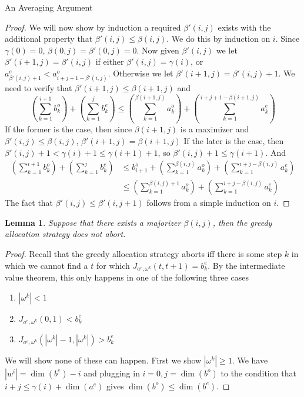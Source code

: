 \documentclass[11pt,a4paper]{article}
\newtheorem{lemma}[subsection]{Lemma}
\begin{document}
\begin{section}{An Averaging Argument}
\begin{proof}
\medskip
We will now show by induction a required $\beta'(i, j)$ exists with the additional property that $\beta'(i,j) \leq \beta(i, j)$. We do this by induction on $i$. Since $\gamma(0) = 0$, $\beta(0, j) = \beta'(0, j) = 0$. Now given $\beta'(i, j)$ we let $\beta'(i + 1, j) = \beta'(i, j)$ if either $\beta'(i, j) = \gamma(i)$, or $a^e_{\beta'(i, j) + 1} < a^o_{i + j + 1 - \beta'(i, j)}$. Otherwise we let $\beta'(i + 1, j) = \beta'(i ,j ) + 1$. We need to verify that $\beta'(i + 1, j) \leq \beta(i + 1, j)$ and
\[
\left ( \sum_{k = 1}^{i + 1} b^o_k \right ) + \left ( \sum_{k = 1}^j b^e_k \right ) \leq \left ( \sum_{k = 1}^{\beta(i + 1, j)} a^o_k \right ) + \left (\sum_{k = 1}^{ i + j +1 - \beta(i + 1, j) } a^e_k \right )
\]
If the former is the case, then since $\beta(i + 1, j)$ is a maximizer and $\beta'(i, j) \leq \beta(i, j)$, $\beta'(i + 1, j) = \beta(i + 1, j)$ If the later is the case, then $\beta'(i, j) + 1 < \gamma(i) + 1 \leq \gamma(i + 1) + 1$, so $\beta'(i, j) + 1 \leq \gamma(i + 1)$. And
\begin{align*}
\left ( \sum_{k = 1}^{i + 1} b^o_k \right ) + \left ( \sum_{k = 1}^j b^e_k \right ) &\leq b^o_{i +1} + \left ( \sum_{k = 1}^{\beta(i, j)} a^o_k \right ) + \left (\sum_{k = 1}^{ i + j- \beta(i , j) } a^e_k \right )\\
& \leq \left ( \sum_{k = 1}^{\beta(i, j) + 1} a^o_k \right ) + \left (\sum_{k = 1}^{ i + j - \beta(i, j) } a^e_k \right )
\end{align*}
The fact that $\beta'(i, j) \leq \beta'(i, j + 1)$ follows from a simple induction on $i$.
\end{proof}
\begin{lemma} \label{no_abort} Suppose that there exists a majorizer $\beta(i, j)$, then the greedy allocation strategy does not abort.
\end{lemma}
\begin{proof} Recall that the greedy allocation strategy aborts iff there is some step $k$ in which we cannot find a $t$ for which $J_{a^e, \omega ^k } (t, t + 1) = b^e_k$. By the intermediate value theorem, this only happens in one of the following three cases
\begin{enumerate}
\item $|\omega^k|< 1$
\item $J_{a^e, \omega^k} (0, 1) < b^e_k$
\item $J_{a^e, \omega^k } ( |\omega^k| - 1, |\omega^k| ) > b^e_k$
\end{enumerate}
We will show none of these can happen. First we show $|\omega^k | \geq 1$. We have $|w^i| = \dim(b^e) - i$ and plugging in $i = 0, j = \dim(b^o)$ to the condition that $i + j \leq \gamma(i) + \dim(a^e)$ gives $\dim(b^o) \leq \dim(b^e)$.

\end{proof}
\end{section}
\end{document}
